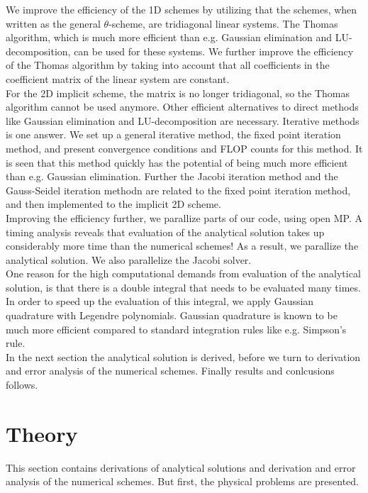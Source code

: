 \documentclass{article}
\begin{document}
We improve the efficiency of the 1D schemes by utilizing that the schemes, when written as the general $\theta$-scheme, are tridiagonal linear systems. The Thomas algorithm, which is much more efficient than e.g. Gaussian elimination and LU-decomposition, can be used for these systems. We further improve the efficiency of the Thomas algorithm by taking into account that all coefficients in the coefficient matrix of the linear system are constant.\\

For the 2D implicit scheme, the matrix is no longer tridiagonal, so the Thomas algorithm cannot be used anymore. Other efficient alternatives to direct methods like Gaussian elimination and LU-decomposition are necessary. Iterative methods is one answer. We set up a general iterative method, the fixed point iteration method, and present convergence conditions and FLOP counts for this method. It is seen that this method quickly has the potential of being much more efficient than e.g. Gaussian elimination. Further the Jacobi iteration method and the Gauss-Seidel iteration methodn are related to the fixed point iteration method, and then implemented to the implicit 2D scheme.\\

Improving the efficiency further, we parallize parts of our code, using open MP. A timing analysis reveals that evaluation of the analytical solution takes up considerably more time than the numerical schemes! As a result, we parallize the analytical solution. We also parallelize the Jacobi solver. \\

One reason for the high computational demands from evaluation of the analytical solution, is that there is a double integral that needs to be evaluated many times. In order to speed up the evaluation of this integral, we apply Gaussian quadrature with Legendre polynomials. Gaussian quadrature is known to be much more efficient compared to standard integration rules like e.g. Simpson's rule.\\

In the next section the analytical solution is derived, before we turn to derivation and error analysis of the numerical schemes. Finally results and conlcusions follows.

\section{Theory}
This section contains derivations of analytical solutions and derivation and error analysis of the numerical schemes. But first, the physical problems are presented.
\end{document}
